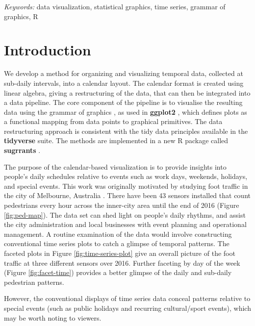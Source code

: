 \documentclass[12pt]{article}
\begin{document}
\noindent%
{\it Keywords:} data visualization, statistical graphics, time series, grammar of graphics, R
\vfill

\newpage
{} %

\hypertarget{introduction}{%
\section{Introduction}\label{introduction}}

We develop a method for organizing and visualizing temporal data,
collected at sub-daily intervals, into a calendar layout. The calendar
format is created using linear algebra, giving a restructuring of the
data, that can then be integrated into a data pipeline. The core
component of the pipeline is to visualise the resulting data using the
grammar of graphics \citep{wilkinson2006grammar, wickham2009ggplot2}, as
used in \textbf{ggplot2} \citep{R-ggplot2}, which defines plots as a
functional mapping from data points to graphical primitives. The data
restructuring approach is consistent with the tidy data principles
available in the \textbf{tidyverse} \citep{R-tidyverse} suite. The
methods are implemented in a new R package called \textbf{sugrrants}
\citep{R-sugrrants}.

The purpose of the calendar-based visualization is to provide insights
into people's daily schedules relative to events such as work days,
weekends, holidays, and special events. This work was originally
motivated by studying foot traffic in the city of Melbourne, Australia
\citep{ped}. There have been 43 sensors installed that count pedestrians
every hour across the inner-city area until the end of 2016 (Figure
\ref{fig:ped-map}). The data set can shed light on people's daily
rhythms, and assist the city administration and local businesses with
event planning and operational management. A routine examination of the
data would involve constructing conventional time series plots to catch
a glimpse of temporal patterns. The faceted plots in Figure
\ref{fig:time-series-plot} give an overall picture of the foot traffic
at three different sensors over 2016. Further faceting by day of the
week (Figure \ref{fig:facet-time}) provides a better glimpse of the
daily and sub-daily pedestrian patterns.

However, the conventional displays of time series data conceal patterns
relative to special events (such as public holidays and recurring
cultural/sport events), which may be worth noting to viewers.
\end{document}
